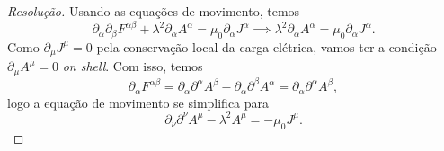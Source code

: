 \begin{proof}[Resolução]
   Usando as equações de movimento, temos
   \begin{equation*}
      \partial_{\alpha} \partial_\beta F^{\alpha \beta} + \lambda^2 \partial_\alpha A^{\alpha} = \mu_0 \partial_\alpha J^\alpha \implies \lambda^2 \partial_\alpha A^{\alpha} = \mu_0 \partial_\alpha J^\alpha.
   \end{equation*}
   Como \(\partial_\mu J^\mu = 0\) pela conservação local da carga elétrica, vamos ter a condição \(\partial_\mu A^\mu = 0\) \emph{on shell}. Com isso, temos
   \begin{equation*}
      \partial_\alpha F^{\alpha \beta} = \partial_\alpha \partial^\alpha A^\beta - \partial_\alpha \partial^\beta A^\alpha = \partial_\alpha \partial^\alpha A^\beta,
   \end{equation*}
   logo a equação de movimento se simplifica para
   \begin{equation*}
       \partial_\nu \partial^\nu A^\mu - \lambda^2 A^\mu = -\mu_0 J^\mu.
   \end{equation*}


\end{proof}
